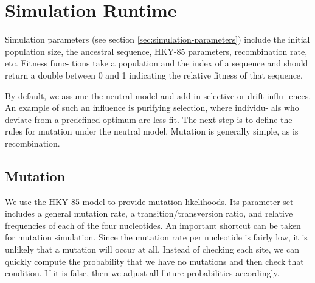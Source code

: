 \documentclass{article}
\begin{document}
  \section{Simulation Runtime}

    Simulation parameters (see section \ref{sec:simulation-parameters}) include
    the initial population size, the ancestral sequence, HKY-85 parameters,
    recombination rate, etc. Fitness func- tions take a population and the index
    of a sequence and should return a double between 0 and 1 indicating the
    relative fitness of that sequence.

    By default, we assume the neutral model and add in selective or drift influ-
    ences. An example of such an influence is purifying selection, where
    individu- als who deviate from a predefined optimum are less fit. The next
    step is to define the rules for mutation under the neutral model.  Mutation
    is generally simple, as is recombination.
    
    \subsection{Mutation}
    
      We use the HKY-85 model to provide mutation likelihoods. Its parameter set
      includes a general mutation rate, a transition/transversion ratio, and
      relative frequencies of each of the four nucleotides. An important
      shortcut can be taken for mutation simulation. Since the mutation rate per
      nucleotide is fairly low, it is unlikely that a mutation will occur at
      all. Instead of checking each site, we can quickly compute the probability
      that we have no mutations and then check that condition. If it is false,
      then we adjust all future probabilities accordingly.
\end{document}
